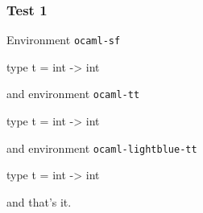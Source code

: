 \documentclass[compress]{beamer}
\begin{document}
\begin{frame}\frametitle{Test 1}

Environment \texttt{ocaml-sf}
\begin{ocaml}
  type t = int -> int
\end{ocaml}
and environment \texttt{ocaml-tt}
\begin{ocaml-tt}
  type t = int -> int
\end{ocaml-tt}
and environment \texttt{ocaml-lightblue-tt}
\begin{ocaml-lightblue-tt}
  type t = int -> int
\end{ocaml-lightblue-tt}
and that's it.
\end{frame}
\end{document}
